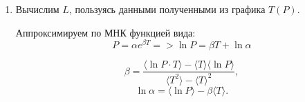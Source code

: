 \documentclass[a4paper, 12pt]{article}%
\begin{document}
\begin{enumerate}
	\begin{figure}[H]
	\end{figure}
	
	\begin{figure}[H]
	\end{figure}
	
	\item Вычислим $L$, пользуясь данными полученными из графика $T(P)$.
	
	Аппроксимируем по МНК функцией вида:
	 \[ P=\alpha e^{\beta T}  => \ln P = \beta T + \ln \alpha\]
	
	\[ \beta = \frac{\langle \ln P \cdot T \rangle - \langle T \rangle \langle \ln P \rangle}{\langle T^2 \rangle - \langle T \rangle ^2},\]
	\[ \ln \alpha = \langle \ln P \rangle - \beta\langle T \rangle. \]
	

\end{enumerate}
\end{document}
